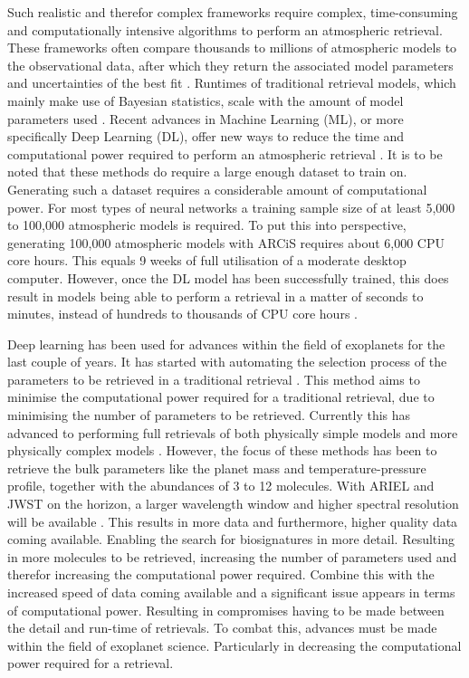 Such realistic and therefor complex frameworks require complex, time-consuming and computationally intensive algorithms to perform an atmospheric retrieval. These frameworks often compare thousands to millions of atmospheric models to the observational data, after which they return the associated model parameters and uncertainties of the best fit \cite{soboczenski2018bayesian, zingales2018exogan}. Runtimes of traditional retrieval models, which mainly make use of Bayesian statistics, scale with the amount of model parameters used \cite{soboczenski2018bayesian}. Recent advances in Machine Learning (ML), or more specifically Deep Learning (DL), offer new ways to reduce the time and computational power required to perform an atmospheric retrieval \cite{waldmann2016dreaming, zingales2018exogan, soboczenski2018bayesian, marquez2018supervised}. It is to be noted that these methods do require a large enough dataset to train on. Generating such a dataset requires a considerable amount of computational power. For most types of neural networks a training sample size of at least 5,000 to 100,000 atmospheric models is required. To put this into perspective, generating 100,000 atmospheric models with ARCiS requires about 6,000 CPU core hours. This equals 9 weeks of full utilisation of a moderate desktop computer. However, once the DL model has been successfully trained, this does result in models being able to perform a retrieval in a matter of seconds to minutes, instead of hundreds to thousands of CPU core hours \cite{soboczenski2018bayesian, zingales2018exogan, marquez2018supervised}.


Deep learning has been used for advances within the field of exoplanets for the last couple of years. It has started with automating the selection process of the parameters to be retrieved in a traditional retrieval \cite{waldmann2016dreaming}. This method aims to minimise the computational power required for a traditional retrieval, due to minimising the number of parameters to be retrieved. Currently this has advanced to performing full retrievals of both physically simple models and more physically complex models \cite{zingales2018exogan, soboczenski2018bayesian}. However, the focus of these methods has been to retrieve the bulk parameters like the planet mass and temperature-pressure profile, together with the abundances of 3 to 12 molecules. With ARIEL and JWST on the horizon, a larger wavelength window and higher spectral resolution will be available \cite{gardner2006james, tinetti2016science}. This results in more data and furthermore, higher quality data coming available. Enabling the search for biosignatures in more detail. Resulting in more molecules to be retrieved, increasing the number of parameters used and therefor increasing the computational power required. Combine this with the increased speed of data coming available and a significant issue appears in terms of computational power. Resulting in compromises having to be made between the detail and run-time of retrievals. To combat this, advances must be made within the field of exoplanet science. Particularly in decreasing the computational power required for a retrieval.

